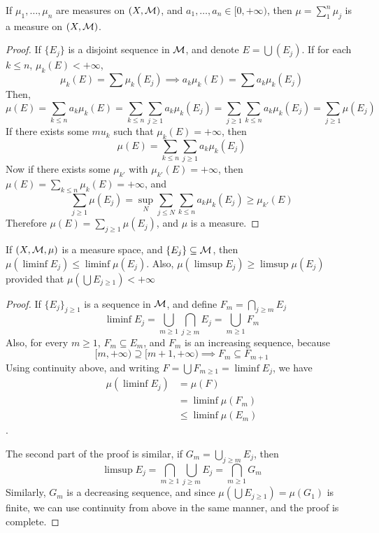 \documentclass[../../main.tex]{subfiles}
\begin{document}
\begin{wts}
    If $\mu_1,\ldots,\mu_n$ are measures on $(X,\mathcal{M})$, and $a_1,\ldots, a_n\in[0,+\infty)$, then $\mu = \sum^n_1\mu_j$ is a measure on $(X,\mathcal{M})$.
\end{wts}
\begin{proof}
    If $\{E_j\}$ is a disjoint sequence in $\mathcal{M}$, and denote $E = \bigcup (E_j)$. If for each $k\leq n$, $\mu_k(E)<+\infty$, 
    \[
    \mu_k(E)=\sum \mu_k(E_j)\implies a_k\mu_k(E)=\sum a_k\mu_k(E_j)
    \]
    Then,
    \[
    \mu(E)=\sum_{k\leq n}a_k\mu_k(E)= \sum_{k\leq n}\sum_{j\geq 1}a_k\mu_k(E_j)=\sum_{j\geq 1}\sum_{k\leq n}a_k\mu_k(E_j)=\sum_{j\geq 1}\mu(E_j)
    \]
    If there exists some $mu_k$ such that $\mu_k(E) = +\infty$, then 
    \[
    \mu(E) = \sum_{k\leq n}\sum_{j\geq 1}a_k\mu_k(E_j)
    \]
    Now if there exists some $\mu_{k'}$ with $\mu_{k'}(E)=+\infty$, then $\mu(E)=\sum_{k\leq n}\mu_k(E)=+\infty$, and 
    \[
    \sum_{j\geq 1}\mu(E_j)=\sup_N\sum_{j\leq N} \sum_{k\leq n}a_k\mu_k(E_j)\geq \mu_{k'}(E)
    \]
    Therefore $\mu(E)=\sum_{j\geq 1}\mu(E_j)$, and $\mu$ is a measure.
\end{proof}
\newpage

\begin{wts}
    If $(X,\mathcal{M},\mu)$ is a measure space, and $\{E_j\}\subseteq \mathcal{M}$, then $\mu(\liminf E_j)\leq \liminf \mu(E_j)$. Also, $\mu(\limsup E_j)\geq \limsup \mu(E_j)$ provided that $\mu(\bigcup E_{j\geq 1})<+\infty$
\end{wts}
\begin{proof}
If $\{E_j\}_{j\geq 1}$ is a sequence in $\mathcal{M}$, and define $F_m = \bigcap_{j\geq m}E_j$
\[
\liminf E_j = \bigcup_{m\geq 1}\bigcap_{j\geq m}E_j = \bigcup_{m\geq 1} F_m
\]
Also, for every $m\geq 1$, $F_m\subseteq E_m$, and $F_m$ is an increasing sequence, because
\[
[m,+\infty)\supseteq [m+1,+\infty)\implies F_m\subseteq F_{m+1}
\]
Using continuity above, and writing $F = \bigcup F_{m\geq 1}=\liminf E_j$, we have
\begin{align*}
    \mu(\liminf E_j) &= \mu(F)\\
    &= \liminf \mu(F_m)\\
    &\leq \liminf \mu(E_m)
\end{align*}.

The second part of the proof is similar, if $G_m = \bigcup_{j\geq m} E_j$, then
\[
\limsup E_j = \bigcap_{m\geq 1}\bigcup_{j\geq m} E_j = \bigcap_{m\geq 1}G_m
\]
Similarly, $G_m$ is a decreasing sequence, and since $\mu(\bigcup E_{j\geq 1}) = \mu(G_1)$ is finite, we can use continuity from above in the same manner, and the proof is complete.
\end{proof}
\newpage
\end{document}
